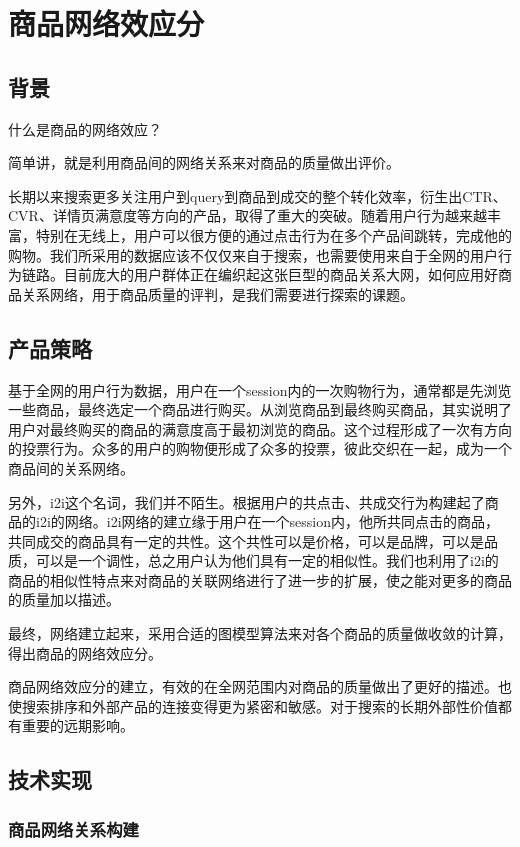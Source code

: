 \section{商品网络效应分}
\subsection{背景}

什么是商品的网络效应？
\par 简单讲，就是利用商品间的网络关系来对商品的质量做出评价。
\par 长期以来搜索更多关注用户到query到商品到成交的整个转化效率，衍生出CTR、CVR、详情页满意度等方向的产品，取得了重大的突破。随着用户行为越来越丰富，特别在无线上，用户可以很方便的通过点击行为在多个产品间跳转，完成他的购物。我们所采用的数据应该不仅仅来自于搜索，也需要使用来自于全网的用户行为链路。目前庞大的用户群体正在编织起这张巨型的商品关系大网，如何应用好商品关系网络，用于商品质量的评判，是我们需要进行探索的课题。

	
\subsection{产品策略}
基于全网的用户行为数据，用户在一个session内的一次购物行为，通常都是先浏览一些商品，最终选定一个商品进行购买。从浏览商品到最终购买商品，其实说明了用户对最终购买的商品的满意度高于最初浏览的商品。这个过程形成了一次有方向的投票行为。众多的用户的购物便形成了众多的投票，彼此交织在一起，成为一个商品间的关系网络。
\par 另外，i2i这个名词，我们并不陌生。根据用户的共点击、共成交行为构建起了商品的i2i的网络。i2i网络的建立缘于用户在一个session内，他所共同点击的商品，共同成交的商品具有一定的共性。这个共性可以是价格，可以是品牌，可以是品质，可以是一个调性，总之用户认为他们具有一定的相似性。我们也利用了i2i的商品的相似性特点来对商品的关联网络进行了进一步的扩展，使之能对更多的商品的质量加以描述。
\par 最终，网络建立起来，采用合适的图模型算法来对各个商品的质量做收敛的计算，得出商品的网络效应分。
\par 商品网络效应分的建立，有效的在全网范围内对商品的质量做出了更好的描述。也使搜索排序和外部产品的连接变得更为紧密和敏感。对于搜索的长期外部性价值都有重要的远期影响。


\subsection{技术实现}
\subsubsection{商品网络关系构建}
